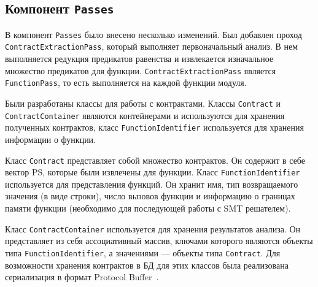 \subsection{Компонент \texttt{Passes}}
В компонент \texttt{Passes} было внесено несколько изменений. Был добавлен проход \texttt{ContractExtractionPass}, который выполняет первоначальный анализ. В нем выполняется редукция предикатов равенства и извлекается изначальное множество предикатов для функции. \texttt{ContractExtractionPass} является \texttt{FunctionPass}, то есть выполняется на каждой функции модуля.

Были разработаны классы для работы с контрактами. Классы \texttt{Contract} и \texttt{ContractContainer} являются контейнерами и используются для хранения полученных контрактов, класс \texttt{FunctionIdentifier} используется для хранения информации о функции. 

Класс \texttt{Contract} представляет собой множество контрактов. Он содержит в себе вектор PS, которые были извлечены для функции. Класс \texttt{FunctionIdentifier} используется для представления функций. Он хранит имя,  тип возвращаемого значения (в виде строки), число вызовов функции и информацию о границах памяти функции (необходимо для последующей работы с SMT решателем). 

Класс \texttt{ContractContainer} используется для хранения результатов анализа. Он представляет из себя ассоциативный массив, ключами которого являются объекты типа \texttt{FunctionIdentifier}, а значениями --- объекты типа \texttt{Contract}. Для возможности хранения контрактов в БД для этих классов была реализована сериализация в формат Protocol Buffer~\cite{protobuf}. 

